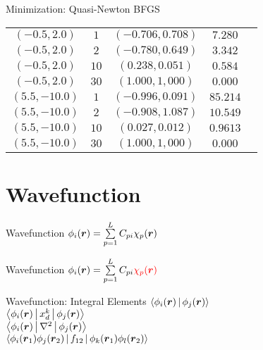 \documentclass[10pt, t, xcolor=dvipsnames]{beamer}
\begin{document}
\begin{frame}[fragile]{Minimization: Quasi-Newton BFGS}
\begin{table}[H]
\begin{tabular}{ccccc}
            $(-0.5,2.0)$ & $1$ & $(-0.706,0.708)$ & $7.280$ \\
            $(-0.5,2.0)$ & $2$ & $(-0.780,0.649)$ & $3.342$ \\
            $(-0.5,2.0)$ & $10$ & $(0.238,0.051)$ & $0.584$ \\
            $(-0.5,2.0)$ & $30$ & $(1.000,1,000)$ & $0.000$ \\
            $(5.5,-10.0)$ & $1$ & $(-0.996,0.091)$ & $85.214$ \\
            $(5.5,-10.0)$ & $2$ & $(-0.908,1.087)$ & $10.549$ \\
            $(5.5,-10.0)$ & $10$ & $(0.027,0.012)$ & $0.9613$ \\
            $(5.5,-10.0)$ & $30$ & $(1.000,1,000)$ & $0.000$ \\ \hline\hline
        \end{tabular}
    \end{table}
\end{frame}

\section{Wavefunction}

{
\begin{frame}[standout]{Wavefunction}
    $\phi_i(\bm{{r}}) = \sum\limits^L_{p=1} C_{pi}\chi_p(\bm{{r}})$
\end{frame}}

{
\begin{frame}[standout]{Wavefunction}
    $\phi_i(\bm{{r}}) = \sum\limits^L_{p=1} C_{pi}\color{red}{\chi_p(\bm{{r}})}$
\end{frame}}

{
\begin{frame}[standout]{Wavefunction: Integral Elements}
    $\Braket{\phi_i(\bm{{r}})|\phi_j(\bm{{r}})}$ \\ \vsp\vsp\vsp\vsp
    $\Braket{\phi_i(\bm{{r}})|x^k_d|\phi_j(\bm{{r}})}$ \\ \vsp\vsp\vsp\vsp
    $\Braket{\phi_i(\bm{{r}})|\nabla^2|\phi_j(\bm{{r}})}$ \\ \vsp\vsp\vsp\vsp
    $\Braket{\phi_i(\bm{{r}}_1)\phi_j(\bm{{r}}_2)|f_{12}|\phi_k(\bm{{r}}_1)\phi_l(\bm{{r}}_2)}$ \\
\end{frame}}
\end{document}
